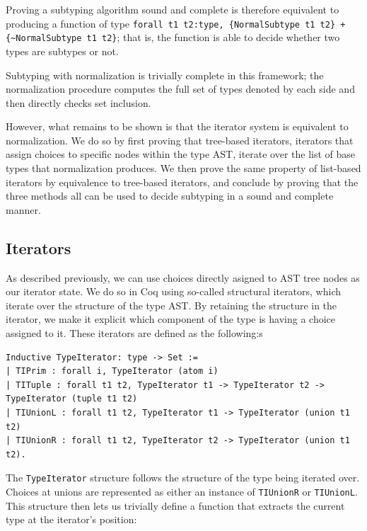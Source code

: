 \documentclass[a4paper,english]{lipics-v2019}
\begin{document}
Proving a subtyping algorithm sound and complete is therefore equivalent to
producing a function of type \verb|forall t1 t2:type, {NormalSubtype t1 t2} + {~NormalSubtype t1 t2}|; 
that is, the function is able to decide whether two types are
subtypes or not.

Subtyping with normalization is trivially complete in this framework; the normalization
procedure computes the full set of types denoted by each side and then directly checks
set inclusion.

However, what remains to be shown is that the iterator system is equivalent to normalization.
We do so by first proving that tree-based iterators, iterators that assign choices to specific
nodes within the type AST, iterate over the list of base types that normalization produces. We
then prove the same property of list-based iterators by equivalence to tree-based iterators, and
conclude by proving that the three methods all can be used to decide subtyping in a sound and complete
manner.

\subsection{Iterators}

As described previously, we can use choices directly asigned to AST tree nodes
as our iterator state. We do so in Coq using so-called structural iterators,
which iterate over the structure of the type AST. By retaining the structure
in the iterator, we make it explicit which component of the type is having a
choice assigned to it. These iterators are defined as the following:s

\begin{small}\begin{verbatim}
Inductive TypeIterator: type -> Set :=
| TIPrim : forall i, TypeIterator (atom i)
| TITuple : forall t1 t2, TypeIterator t1 -> TypeIterator t2 -> TypeIterator (tuple t1 t2)
| TIUnionL : forall t1 t2, TypeIterator t1 -> TypeIterator (union t1 t2)
| TIUnionR : forall t1 t2, TypeIterator t2 -> TypeIterator (union t1 t2).
\end{verbatim}\end{small}

The \verb|TypeIterator| structure follows the structure of the type being
iterated over. Choices at unions are represented as either an instance of
\verb|TIUnionR| or \verb|TIUnionL|. This structure then lets us trivially
define a function that extracts the current type at the iterator's position:
\end{document}
